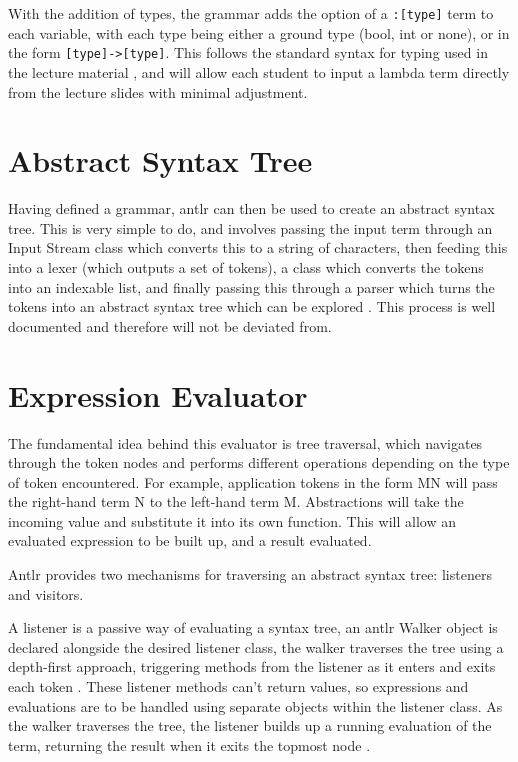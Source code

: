 \documentclass[a4paper,12pt]{report}
\begin{document}
With the addition of types, the grammar adds the option of a \texttt{:[type]} term to each variable, with each type being either a ground type (bool, int or none), or in the form \texttt{[type]->[type]}. This follows the standard syntax for typing used in the lecture material \cite{Hankin2004} \cite{Gay2019}, and will allow each student to input a lambda term directly from the lecture slides with minimal adjustment.

\section{Abstract Syntax Tree}

Having defined a grammar, antlr can then be used to create an abstract syntax tree. This is very simple to do, and involves passing the input term through an Input Stream class which converts this to a string of characters, then feeding this into a lexer (which outputs a set of tokens), a class which converts the tokens into an indexable list, and finally passing this through a parser which turns the tokens into an abstract syntax tree which can be explored \cite{Tomassetti2007}. This process is well documented and therefore will not be deviated from.

\section{Expression Evaluator}

The fundamental idea behind this evaluator is tree traversal, which navigates through the token nodes and performs different operations depending on the type of token encountered. For example, application tokens in the form MN will pass the right-hand term N to the left-hand term M. Abstractions will take the incoming value and substitute it into its own function. This will allow an evaluated expression to be built up, and a result evaluated.

Antlr provides two mechanisms for traversing an abstract syntax tree: listeners and visitors.

A listener is a passive way of evaluating a syntax tree, an antlr Walker object is declared alongside the desired listener class, the walker traverses the tree using a depth-first approach, triggering methods from the listener as it enters and exits each token \cite{Parr2012}. These listener methods can’t return values, so expressions and evaluations are to be handled using separate objects within the listener class. As the walker traverses the tree, the listener builds up a running evaluation of the term, returning the result when it exits the topmost node \cite{Srivastav2017}.
\end{document}
